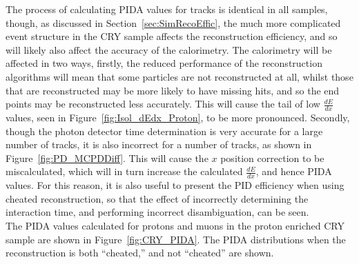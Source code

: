 The process of calculating PIDA values for tracks is identical in all samples, though, as discussed in Section~\ref{sec:SimRecoEffic}, the much more complicated event structure in the CRY sample affects the reconstruction efficiency, and so will likely also affect the accuracy of the calorimetry. The calorimetry will be affected in two ways, firstly, the reduced performance of the reconstruction algorithms will mean that some particles are not reconstructed at all, whilst those that are reconstructed may be more likely to have missing hits, and so the end points may be reconstructed less accurately. This will cause the tail of low $\frac{dE}{dx}$ values, seen in Figure~\ref{fig:Isol_dEdx_Proton}, to be more pronounced. Secondly, though the photon detector time determination is very accurate for a large number of tracks, it is also incorrect for a number of tracks, as shown in Figure~\ref{fig:PD_MCPDDiff}. This will cause the $x$ position correction to be miscalculated, which will in turn increase the calculated $\frac{dE}{dx}$, and hence PIDA values. For this reason, it is also useful to present the PID efficiency when using cheated reconstruction, so that the effect of incorrectly determining the interaction time, and performing incorrect disambiguation, can be seen. \\

The PIDA values calculated for protons and muons in the proton enriched CRY sample are shown in Figure~\ref{fig:CRY_PIDA}. The PIDA distributions when the reconstruction is both ``cheated,'' and not ``cheated'' are shown. \\

